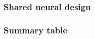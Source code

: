 \documentclass[12pt,a4paper,oneside]{article}
\begin{document}
\subsubsection{Shared neural design}\label{subsubsec:shared_neural}



\subsubsection{Summary table}\label{subsubsec:model_summary}
\end{document}
